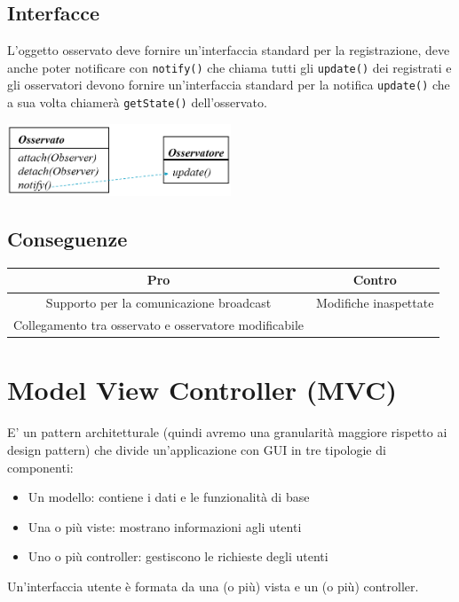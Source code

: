 \documentclass[12pt, a4paper]{report}
\begin{document}
\subsection{Interfacce}
L'oggetto osservato deve fornire un'interfaccia standard per la registrazione, deve anche poter notificare  con \texttt{notify()} che chiama tutti gli \texttt{update()} dei registrati  e gli osservatori devono fornire un'interfaccia standard per la notifica \texttt{update()} che a sua volta chiamerà \texttt{getState()} dell'osservato.
\begin{center}
    \includegraphics[width=0.5\textwidth]{Immagini/observerinterface.png}
\end{center}
\subsection{Conseguenze}
\begin{center}
    \begin{tabular}{| c | c |}
        \hline
        \textbf{Pro} & \textbf{Contro} \\
        \hline
        Supporto per la comunicazione broadcast & Modifiche inaspettate \\
        \hline
        Collegamento tra osservato e osservatore modificabile & \\
        \hline
    \end{tabular}
\end{center}
\section{Model View Controller (MVC)}
E' un pattern architetturale (quindi avremo una granularità maggiore rispetto ai design pattern) che divide un'applicazione con GUI in tre tipologie di componenti:
\begin{itemize}
    \item Un modello: contiene i dati e le funzionalità di base
    \item Una o più viste: mostrano informazioni agli utenti
    \item Uno o più controller: gestiscono le richieste degli utenti
\end{itemize}
Un'interfaccia utente è formata da una (o più) vista e un (o più) controller.
\end{document}
